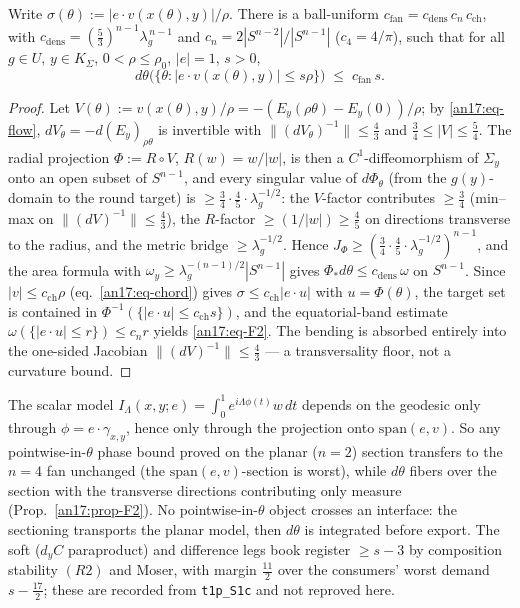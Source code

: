 \begin{proposition}\label{an17:prop-F2}\label{an17:F2}%
Write $\sigma(\theta):=|e\cdot v(x(\theta),y)|/\rho$. There is a ball-uniform
$c_{\mathrm{fan}}=c_{\mathrm{dens}}\,c_n\,c_{\mathrm{ch}}$, with $c_{\mathrm{dens}}
=(\tfrac53)^{n-1}\lambda_g^{\,n-1}$ and $c_n=2|S^{n-2}|/|S^{n-1}|$ ($c_4=4/\pi$),
such that for all $g\in U$, $y\in K_\Sigma$, $0<\rho\le\rho_0$, $|e|=1$, $s>0$,
\begin{equation}\label{an17:eq-F2}
 d\theta\bigl(\{\theta:|e\cdot v(x(\theta),y)|\le s\rho\}\bigr)\;\le\;
 c_{\mathrm{fan}}\,s .
\end{equation}
\end{proposition}
\begin{proof}
Let $V(\theta):=v(x(\theta),y)/\rho=-(E_y(\rho\theta)-E_y(0))/\rho$; by
\eqref{an17:eq-flow}, $dV_\theta=-d(E_y)_{\rho\theta}$ is invertible with
$\|(dV_\theta)^{-1}\|\le\tfrac43$ and $\tfrac34\le|V|\le\tfrac54$. The radial
projection $\Phi:=R\circ V$, $R(w)=w/|w|$, is then a $C^1$-diffeomorphism of
$\Sigma_y$ onto an open subset of $S^{n-1}$, and every singular value of
$d\Phi_\theta$ (from the $g(y)$-domain to the round target) is $\ge\tfrac34\cdot
\tfrac45\cdot\lambda_g^{-1/2}$: the $V$-factor contributes $\ge\tfrac34$ (min--max
on $\|(dV)^{-1}\|\le\tfrac43$), the $R$-factor $\ge(1/|w|)\ge\tfrac45$ on
directions transverse to the radius, and the metric bridge $\ge\lambda_g^{-1/2}$.
Hence $J_\Phi\ge(\tfrac34\cdot\tfrac45\cdot\lambda_g^{-1/2})^{n-1}$, and the area
formula with $\omega_y\ge\lambda_g^{-(n-1)/2}|S^{n-1}|$ gives $\Phi_*d\theta\le
c_{\mathrm{dens}}\,\omega$ on $S^{n-1}$. Since $|v|\le c_{\mathrm{ch}}\rho$
(eq.~\eqref{an17:eq-chord}) gives $\sigma\le c_{\mathrm{ch}}|e\cdot u|$ with
$u=\Phi(\theta)$, the target set is contained in $\Phi^{-1}(\{|e\cdot u|\le
c_{\mathrm{ch}}s\})$, and the equatorial-band estimate $\omega(\{|e\cdot u|\le r\})
\le c_n r$ yields \eqref{an17:eq-F2}. The bending is absorbed entirely into the
one-sided Jacobian $\|(dV)^{-1}\|\le\tfrac43$ --- a transversality floor, not a
curvature bound.
\end{proof}

\begin{remark}\label{an17:rem-R6}
The scalar model $I_\Lambda(x,y;e)=\int_0^1 e^{i\Lambda\phi(t)}w\,dt$ depends on
the geodesic only through $\phi=e\cdot\gamma_{x,y}$, hence only through the
projection onto $\mathrm{span}(e,v)$. So any pointwise-in-$\theta$ phase bound
proved on the planar ($n=2$) section transfers to the $n=4$ fan unchanged (the
$\mathrm{span}(e,v)$-section is worst), while $d\theta$ fibers over the section
with the transverse directions contributing only measure
(Prop.~\ref{an17:prop-F2}). No pointwise-in-$\theta$ object crosses an interface:
the sectioning transports the planar model, then $d\theta$ is integrated before
export. The soft ($d_yC$ paraproduct) and difference legs book register $\ge s-3$
by composition stability $(R2)$ and Moser, with margin $\tfrac{11}2$ over the
consumers' worst demand $s-\tfrac{17}2$; these are recorded from
\texttt{t1p\_S1c} and not reproved here.
\end{remark}

